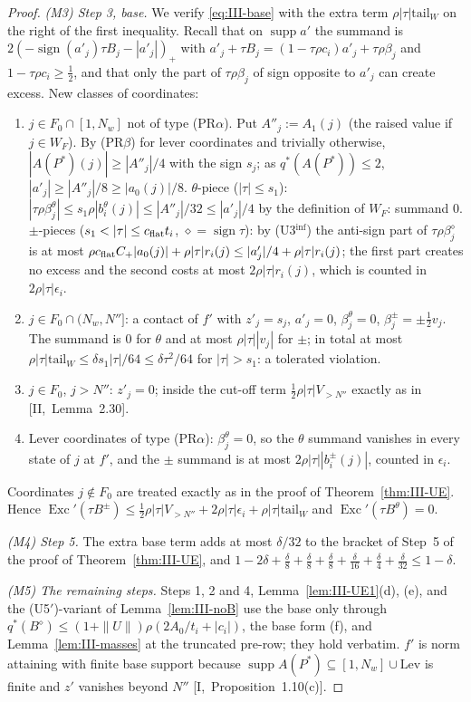 \documentclass[10pt]{amsart}
\theoremstyle{definition}
\theoremstyle{remark}
\newcommand{\supp}{\operatorname{supp}}
\newcommand{\sgn}{\operatorname{sign}}
\newcommand{\Exc}{\operatorname{Exc}}
\begin{document}
\begin{proof}
\emph{(M3) Step 3, base.}  We verify \eqref{eq:III-base} with the extra term
$\rho|\tau|\mathrm{tail}_W$ on the right of the first inequality.  Recall that on
$\supp a'$ the summand is $2(-\sgn(a'_j)\tau B_j-|a'_j|)_+$ with
$a'_j+\tau B_j=(1-\tau\rho c_i)a'_j+\tau\rho\beta_j$ and $1-\tau\rho c_i\ge
\frac12$, and that only the part of $\tau\rho\beta_j$ of sign opposite to
$a'_j$ can create excess.  New classes of coordinates:
\begin{enumerate}
\item[(1)] $j\in F_0\cap[1,N_w]$ not of type (PR$\alpha$).  Put $A''_j:=A_1(j)$
(the raised value if $j\in W_F$).  By (PR$\beta$) for lever coordinates and
trivially otherwise, $|A(P^*)(j)|\ge|A''_j|/4$ with the sign $s_j$; as
$q^*(A(P^*))\le2$, $|a'_j|\ge|A''_j|/8\ge|a_0(j)|/8$.  $\theta$-piece
($|\tau|\le s_1$): $|\tau\rho\beta^\theta_j|\le s_1\rho|b^\theta_i(j)|\le
|A''_j|/32\le|a'_j|/4$ by the definition of $W_F$: summand $0$.  $\pm$-pieces
($s_1<|\tau|\le c_{\rm flat}t_i$, $\diamond=\sgn\tau$): by
(U3$^{\inf}$) the anti-sign part of $\tau\rho\beta^\diamond_j$ is at most
$\rho c_{\rm flat}C_+|a_0(j)|+\rho|\tau|r_i(j)\le|a'_j|/4+\rho|\tau|r_i(j)$;
the first part creates no excess and the second costs at most
$2\rho|\tau|r_i(j)$, which is counted in $2\rho|\tau|\epsilon_i$.
\item[(2)] $j\in F_0\cap(N_w,N'']$: a contact of $f'$ with $z'_j=s_j$, $a'_j=0$,
$\beta^\theta_j=0$, $\beta^\pm_j=\pm\frac12v_j$.  The summand is $0$ for
$\theta$ and at most $\rho|\tau||v_j|$ for $\pm$; in total at most
$\rho|\tau|\mathrm{tail}_W\le\delta s_1|\tau|/64\le\delta\tau^2/64$ for
$|\tau|>s_1$: a tolerated violation.
\item[(3)] $j\in F_0$, $j>N''$: $z'_j=0$; inside the cut-off term
$\frac12\rho|\tau|V_{>N''}$ exactly as in [II,~Lemma~2.30].
\item[(4)] Lever coordinates of type (PR$\alpha$): $\beta^\theta_j=0$, so the
$\theta$ summand vanishes in every state of $j$ at $f'$, and the $\pm$ summand is
at most $2\rho|\tau||b^\pm_i(j)|$, counted in $\epsilon_i$.
\end{enumerate}
Coordinates $j\notin F_0$ are treated exactly as in the proof of
Theorem~\ref{thm:III-UE}.  Hence $\Exc'(\tau B^\pm)\le\frac12\rho|\tau|
V_{>N''}+2\rho|\tau|\epsilon_i+\rho|\tau|\mathrm{tail}_W$ and
$\Exc'(\tau B^\theta)=0$.

\emph{(M4) Step 5.}  The extra base term adds at most $\delta/32$ to the
bracket of Step~5 of the proof of Theorem~\ref{thm:III-UE}, and
$1-2\delta+\frac\delta8+\frac\delta8+\frac\delta8+\frac\delta{16}+
\frac\delta4+\frac\delta{32}\le1-\delta$.

\emph{(M5) The remaining steps.}  Steps 1, 2 and 4, Lemma~\ref{lem:III-UE1}(d),
(e), and the (U5$'$)-variant of Lemma~\ref{lem:III-noB} use the base only
through $q^*(B^\diamond)\le(1+\|U\|)\rho(2A_0/t_i+|c_i|)$, the base form
(f), and Lemma~\ref{lem:III-masses} at the truncated pre-row; they hold
verbatim.  $f'$ is norm attaining with finite base support because
$\supp A(P^*)\subseteq[1,N_w]\cup\mathrm{Lev}$ is finite and $z'$ vanishes
beyond $N''$ [I,~Proposition~1.10(c)].
\end{proof}
\end{document}
